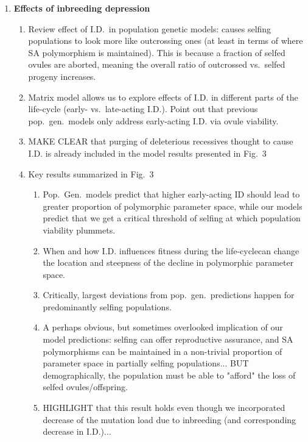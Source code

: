 \documentclass[11pt]{article}
\begin{document}
\begin{enumerate}
	\item {\bf Effects of inbreeding depression}
	\begin{enumerate}
		\item Review effect of I.D.~in population genetic models: causes selfing populations to look more like outcrossing ones (at least in terms of where SA polymorphism is maintained). This is because a fraction of selfed ovules are aborted, meaning the overall ratio of outcrossed vs.~selfed progeny increases.
		\item Matrix model allows us to explore effects of I.D. in different parts of the life-cycle (early- vs.~late-acting I.D.). Point out that previous pop.~gen.~models only address early-acting I.D. via ovule viability.
		\item MAKE CLEAR that purging of deleterious recessives thought to cause I.D. is already included in the model results presented in Fig.~3
		\item Key results summarized in Fig.~3
		\begin{enumerate}
			\item Pop.~Gen.~models predict that higher early-acting ID should lead to greater proportion of polymorphic parameter space, while our models predict that we get a critical threshold of selfing at which population viability plummets.
			\item When and how I.D. influences fitness during the life-cyclecan change the location and steepness of the decline in polymorphic parameter space.
			\item Critically, largest deviations from pop.~gen.~predictions happen for predominantly selfing populations.
			\item A perhaps obvious, but sometimes overlooked implication of our model predictions: selfing can offer reproductive assurance, and SA polymorphisms can be maintained in a non-trivial proportion of parameter space in partially selfing populations... BUT demographically, the population must be able to "afford" the loss of selfed ovules/offspring.
			\item HIGHLIGHT that this result holds even though we incorporated decrease of the mutation load due to inbreeding (and corresponding decrease in I.D.)...	
		\end{enumerate}
	\end{enumerate}


\end{enumerate}
\end{document}
